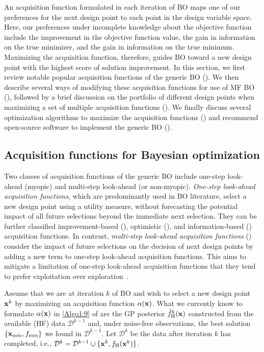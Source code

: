 \documentclass[iicol,sn-basic]{sn-jnl}%
\begin{document}
An acquisition function formulated in each iteration of BO maps one of our preferences for the next design point to each point in the design variable space. 
Here, our preferences under incomplete knowledge about the objective function include the improvement in the objective function value, the gain in information on the true minimizer, and the gain in information on the true minimum.
Maximizing the acquisition function, therefore, guides BO toward a new design point with the highest score of solution improvement.
In this section, we first review notable popular acquisition functions of the generic BO ().
We then describe several ways of modifying these acquisition functions for use of MF BO (), followed by a brief discussion on the portfolio of different design points when maximizing a set of multiple acquisition functions ().
We finally discuss several optimization algorithms to maximize the acquisition functions () and recommend open-source software to implement the generic BO ().

\subsection{Acquisition functions for Bayesian optimization}\label{Sec51}

Two classes of acquisition functions of the generic BO include one-step look-ahead (myopic) and multi-step look-ahead (or non-myopic).
\textit{One-step look-ahead acquisition functions}, which are predominantly used in BO literature, select a new design point using a utility measure, without forecasting the potential impact of all future selections beyond the immediate next selection.
They can be further classified improvement-based (), optimistic (), and  information-based () acquisition functions.
In contrast, \textit{multi-step look-ahead acquisition functions} () consider the impact of future selections on the decision of next design points by adding a new term to one-step look-ahead acquisition functions.
This aims to mitigate a limitation of one-step look-ahead acquisition functions that they tend to prefer exploitation over exploration~\citep{Hennig2022}.

Assume that we are at iteration $k$ of BO and wish to select a new design point ${\bf x}^{k}$ by maximizing an acquisition function $\alpha({\bf x})$.
What we currently know to formulate $\alpha({\bf x})$ in \cref{Algo1:9} of  are the GP posterior $\hat{f}_\text{H}^k({\bf x})$ constructed from the available (HF) data $\mathcal{D}^{k-1}$ and, under noise-free observations, the best solution $\{{\bf x}_{\min}, f_{\min}\}$ we found in $\mathcal{D}^{k-1}$.
Let $\mathcal{D}^{k}$ be the data after iteration $k$ has completed, i.e., $\mathcal{D}^{k} = \mathcal{D}^{k-1} \cup \{{\bf x}^{k},f_\text{H}({\bf x}^{k})\}$.
\end{document}
